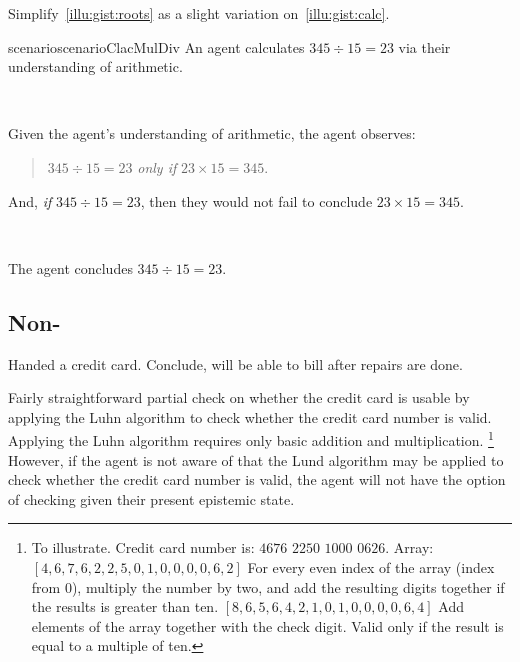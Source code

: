 \begin{note}
  Simplify~\ref{illu:gist:roots} as a slight variation on~\ref{illu:gist:calc}.

  \begin{restatable}{scenario}{scenarioClacMulDiv}
    \label{illu:sketch:math}
    An agent calculates \(345 \div 15 = 23\) via their understanding of arithmetic.

    \mbox{ }

    Given the agent's understanding of arithmetic, the agent observes:
    \begin{quote}
      \(345 \div 15 = 23\) \emph{only if} \(23 \times 15 = 345\).
    \end{quote}
    And, \emph{if} \(345 \div 15 = 23\), then they would not fail to conclude \(23 \times 15 = 345\).

    \mbox{ }

    The agent concludes \(345 \div 15 = 23\).
  \end{restatable}
\end{note}

\subsection{Non-}

\begin{note}
  \begin{scenario}
    \label{illu:number-check}
    Handed a credit card.
    Conclude, will be able to bill after repairs are done.
  \end{scenario}

  Fairly straightforward partial check on whether the credit card is usable by applying the Luhn algorithm to check whether the credit card number is valid.
  Applying the Luhn algorithm requires only basic addition and multiplication.%
  \footnote{
    To illustrate.
    Credit card number is:
    \(4676\) \(2250\) \(1000\) \(0626\).
    Array:
    \([4,6,7,6,2,2,5,0,1,0,0,0,0,6,2]\)
    For every even index of the array (index from \(0\)), multiply the number by two, and add the resulting digits together if the results is greater than ten.
    \([8,6,5,6,4,2,1,0,1,0,0,0,0,6,4]\)
    Add elements of the array together with the check digit.
    Valid only if the result is equal to a multiple of ten.
  }
  However, if the agent is not aware of that the Lund algorithm may be applied to check whether the credit card number is valid, the agent will not have the option of checking given their present epistemic state.
\end{note}


